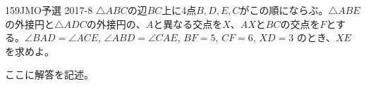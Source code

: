 \begin{thm}{159}{}{JMO予選 2017-8}
 $\triangle{ABC}$の辺$BC$上に4点$B, D, E, C$がこの順にならぶ。$\triangle{ABE}$の外接円と$\triangle{ADC}$の外接円の、$A$と異なる交点を$X$、$AX$と$BC$の交点を$F$とする。$\angle{BAD}=\angle{ACE}$, $\angle{ABD}=\angle{CAE}$, $BF=5$, $CF=6$, $XD=3$ のとき、$XE$を求めよ。
\end{thm}

ここに解答を記述。